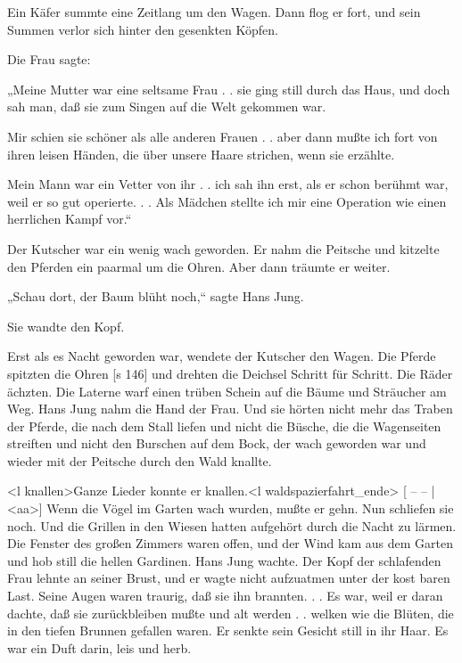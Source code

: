 Ein Käfer summte eine Zeitlang um den Wagen.
Dann flog er fort, und sein Summen verlor sich
hinter den gesenkten Köpfen.

Die Frau sagte:

„Meine Mutter war eine seltsame Frau . . sie
ging still durch das Haus, und doch sah man, daß
sie zum Singen auf die Welt gekommen war.

Mir schien sie schöner als alle anderen Frauen
. . aber dann mußte ich fort von ihren leisen Händen,
die über unsere Haare strichen, wenn sie erzählte.

Mein Mann war ein Vetter von ihr . . ich sah
ihn erst, als er schon berühmt war, weil er so gut
operierte. . . Als Mädchen stellte ich mir eine
Operation wie einen herrlichen Kampf vor.“

Der Kutscher war ein wenig wach geworden.
Er nahm die Peitsche und kitzelte den Pferden ein
paarmal um die Ohren. Aber dann träumte er weiter.

„Schau dort, der Baum blüht noch,“ sagte
Hans Jung.

Sie wandte den Kopf.

Erst als es Nacht geworden war, wendete der
Kutscher den Wagen. Die Pferde spitzten die Ohren
[s 146]
und drehten die Deichsel Schritt für Schritt. Die
Räder ächzten. Die Laterne warf einen trüben Schein
auf die Bäume und Sträucher am Weg. Hans Jung
nahm die Hand der Frau. Und sie hörten nicht
mehr das Traben der Pferde, die nach dem Stall
liefen und nicht die Büsche, die die Wagenseiten
streiften und nicht den Burschen auf dem Bock, der
wach geworden war und wieder mit der Peitsche
durch den Wald knallte.

<l knallen>Ganze Lieder konnte er knallen.<l waldspazierfahrt_ende>
[
– –
|<aa>]
Wenn die Vögel im Garten wach wurden,
mußte er gehn. Nun schliefen sie noch. Und die
Grillen in den Wiesen hatten aufgehört durch die
Nacht zu lärmen. Die Fenster des großen Zimmers
waren offen, und der Wind kam aus dem Garten
und hob still die hellen Gardinen. Hans Jung wachte.
Der Kopf der schlafenden Frau lehnte an seiner
Brust, und er wagte nicht aufzuatmen unter der kost­
baren Last. Seine Augen waren traurig, daß sie ihn
brannten. . . Es war, weil er daran dachte, daß sie
zurückbleiben mußte und alt werden . . welken wie
die Blüten, die in den tiefen Brunnen gefallen waren.
Er senkte sein Gesicht still in ihr Haar. Es war
ein Duft darin, leis und herb.

